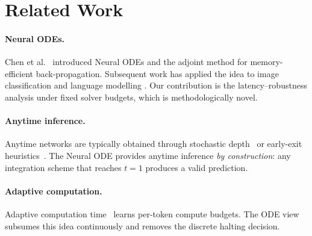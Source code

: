 \section{Related Work}
\paragraph{Neural ODEs.} Chen et al.~\cite{chen2018node} introduced Neural
ODEs and the adjoint method for memory-efficient back-propagation.
Subsequent work has applied the idea to image classification
\cite{dupont2019augmented} and language modelling
\cite{lu2019understanding}. Our contribution is the latency--robustness
analysis under fixed solver budgets, which is methodologically novel.

\paragraph{Anytime inference.} Anytime networks are typically obtained
through stochastic depth~\cite{huang2016stochastic} or early-exit
heuristics~\cite{schwartz2020right}. The Neural ODE provides anytime
inference \emph{by construction}: any integration scheme that reaches
$t=1$ produces a valid prediction.

\paragraph{Adaptive computation.} Adaptive computation
time~\cite{graves2016adaptive} learns per-token compute budgets. The ODE
view subsumes this idea continuously and removes the discrete halting
decision.
